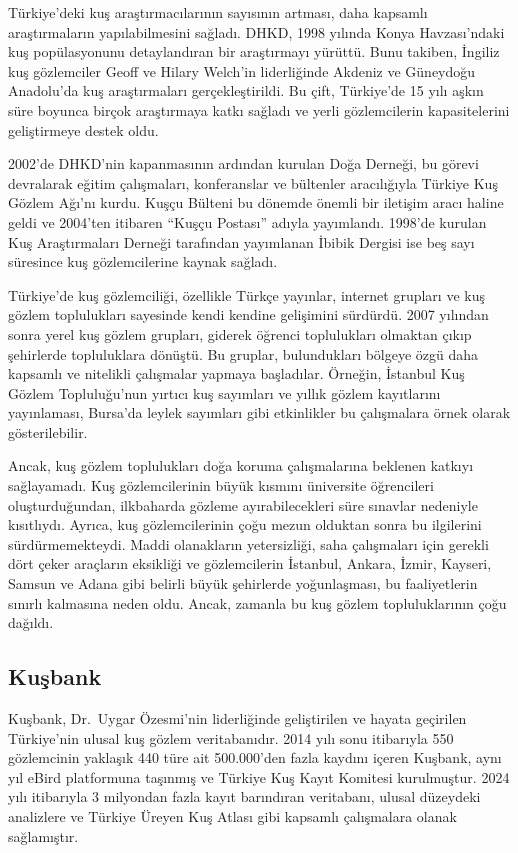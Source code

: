 \documentclass[
  a4paper,
  DIV=11,
  numbers=noendperiod]{scrreprt}
\begin{document}
Türkiye'deki kuş araştırmacılarının sayısının artması, daha kapsamlı
araştırmaların yapılabilmesini sağladı. DHKD, 1998 yılında Konya
Havzası'ndaki kuş popülasyonunu detaylandıran bir araştırmayı yürüttü.
Bunu takiben, İngiliz kuş gözlemciler Geoff ve Hilary Welch'in
liderliğinde Akdeniz ve Güneydoğu Anadolu'da kuş araştırmaları
gerçekleştirildi. Bu çift, Türkiye'de 15 yılı aşkın süre boyunca birçok
araştırmaya katkı sağladı ve yerli gözlemcilerin kapasitelerini
geliştirmeye destek oldu.

2002'de DHKD'nin kapanmasının ardından kurulan Doğa Derneği, bu görevi
devralarak eğitim çalışmaları, konferanslar ve bültenler aracılığıyla
Türkiye Kuş Gözlem Ağı'nı kurdu. Kuşçu Bülteni bu dönemde önemli bir
iletişim aracı haline geldi ve 2004'ten itibaren ``Kuşçu Postası''
adıyla yayımlandı. 1998'de kurulan Kuş Araştırmaları Derneği tarafından
yayımlanan İbibik Dergisi ise beş sayı süresince kuş gözlemcilerine
kaynak sağladı.

Türkiye'de kuş gözlemciliği, özellikle Türkçe yayınlar, internet
grupları ve kuş gözlem toplulukları sayesinde kendi kendine gelişimini
sürdürdü. 2007 yılından sonra yerel kuş gözlem grupları, giderek öğrenci
toplulukları olmaktan çıkıp şehirlerde topluluklara dönüştü. Bu gruplar,
bulundukları bölgeye özgü daha kapsamlı ve nitelikli çalışmalar yapmaya
başladılar. Örneğin, İstanbul Kuş Gözlem Topluluğu'nun yırtıcı kuş
sayımları ve yıllık gözlem kayıtlarını yayınlaması, Bursa'da leylek
sayımları gibi etkinlikler bu çalışmalara örnek olarak gösterilebilir.

Ancak, kuş gözlem toplulukları doğa koruma çalışmalarına beklenen
katkıyı sağlayamadı. Kuş gözlemcilerinin büyük kısmını üniversite
öğrencileri oluşturduğundan, ilkbaharda gözleme ayırabilecekleri süre
sınavlar nedeniyle kısıtlıydı. Ayrıca, kuş gözlemcilerinin çoğu mezun
olduktan sonra bu ilgilerini sürdürmemekteydi. Maddi olanakların
yetersizliği, saha çalışmaları için gerekli dört çeker araçların
eksikliği ve gözlemcilerin İstanbul, Ankara, İzmir, Kayseri, Samsun ve
Adana gibi belirli büyük şehirlerde yoğunlaşması, bu faaliyetlerin
sınırlı kalmasına neden oldu. Ancak, zamanla bu kuş gözlem
topluluklarının çoğu dağıldı.

\subsection*{Kuşbank}\label{kuux15fbank}

Kuşbank, Dr.~Uygar Özesmi'nin liderliğinde geliştirilen ve hayata
geçirilen Türkiye'nin ulusal kuş gözlem veritabanıdır. 2014 yılı sonu
itibarıyla 550 gözlemcinin yaklaşık 440 türe ait 500.000'den fazla
kaydını içeren Kuşbank, aynı yıl eBird platformuna taşınmış ve Türkiye
Kuş Kayıt Komitesi kurulmuştur. 2024 yılı itibarıyla 3 milyondan fazla
kayıt barındıran veritabanı, ulusal düzeydeki analizlere ve Türkiye
Üreyen Kuş Atlası gibi kapsamlı çalışmalara olanak sağlamıştır.
\end{document}
